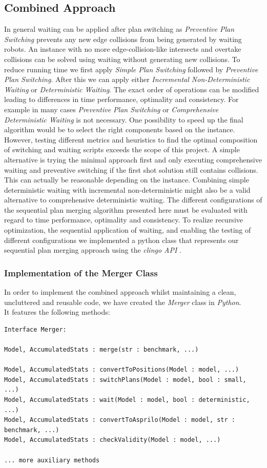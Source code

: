 \documentclass{llncs}
\begin{document}
\subsection{Combined Approach}
In general waiting can be applied after plan switching as \emph{Preventive Plan Switching} prevents any new edge collisions from being generated by waiting robots. An instance with no more edge-collision-like intersects and overtake collisions can be solved using waiting without generating new collisions. To reduce running time we first apply \emph{Simple Plan Switching} followed by \emph{Preventive Plan Switching}. After this we can apply either \emph{Incremental Non-Deterministic Waiting} or \emph{Deterministic Waiting}. The exact order of operations can be modified leading to differences in time performance, optimality and consistency. For example in many cases \emph{Preventive Plan Switching} or \emph{Comprehensive Deterministic Waiting} is not necessary. One possibility to speed up the final algorithm would be to select the right components based on the instance. However, testing different metrics and heuristics to find the optimal composition of switching and waiting scripts exceeds the scope of this project.
A simple alternative is trying the minimal approach first and only executing comprehensive waiting and preventive switching if the first shot solution still contains collisions. This can actually be reasonable depending on the instance. 
Combining simple deterministic waiting with incremental non-deterministic might also be a valid alternative to comprehensive deterministic waiting. The different configurations of the sequential plan merging algorithm presented here must be evaluated with regard to time performance, optimality and consistency.
To realize recursive optimization, the sequential application of waiting, and enabling the testing of different configurations we implemented a python class that represents our sequential plan merging approach using the \emph{clingo API} \cite{api}.

\subsubsection{Implementation of the Merger Class}
In order to implement the combined approach whilst maintaining a clean, uncluttered and reusable code, we have created the \emph{Merger} class in \emph{Python}.\\
It features the following methods:
\begin{verbatim}
Interface Merger:

Model, AccumulatedStats : merge(str : benchmark, ...)

Model, AccumulatedStats : convertToPositions(Model : model, ...)
Model, AccumulatedStats : switchPlans(Model : model, bool : small, ...)
Model, AccumulatedStats : wait(Model : model, bool : deterministic, ...)
Model, AccumulatedStats : convertToAsprilo(Model : model, str : benchmark, ...)
Model, AccumulatedStats : checkValidity(Model : model, ...)
    
... more auxiliary methods

\end{verbatim}
\end{document}
